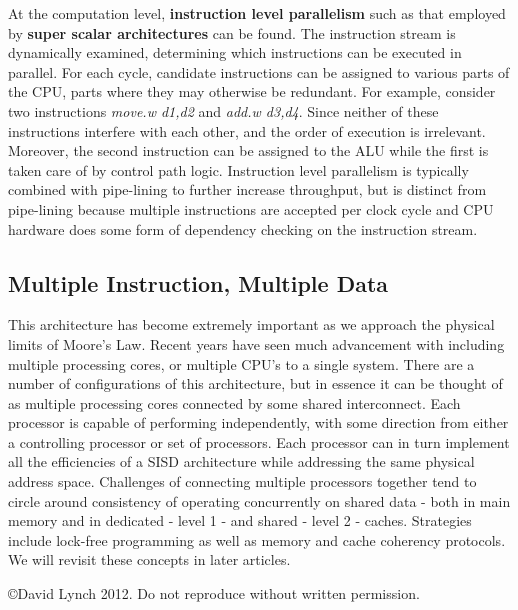 \documentclass[10pt,a4paper]{article}
\begin{document}
At the computation level, {\bf instruction level parallelism} such as that employed by {\bf super scalar architectures} can be found. The instruction stream is dynamically examined, determining which instructions can be executed in parallel. For each cycle, candidate instructions can be assigned to various parts of the CPU, parts where they may otherwise be redundant. For example, consider two instructions {\it move.w d1,d2} and {\it add.w d3,d4}. Since neither of these instructions interfere with each other, and the order of execution is irrelevant. Moreover, the second instruction can be assigned to the ALU while the first is taken care of by control path logic. Instruction level parallelism is typically combined with pipe-lining to further increase throughput, but is distinct from pipe-lining because multiple instructions are accepted per clock cycle and CPU hardware does some form of dependency checking on the instruction stream. 
\subsection{Multiple Instruction, Multiple Data}
This architecture has become extremely important as we approach the physical limits of Moore's Law. Recent years have seen much advancement with including multiple processing cores, or multiple CPU's to a single system. There are a number of configurations of this architecture, but in essence it can be thought of as multiple processing cores connected by some shared interconnect. Each processor is capable of performing independently, with some direction from either a controlling processor or set of processors. Each processor can in turn implement all the efficiencies of a SISD architecture while addressing the same physical address space. Challenges of connecting multiple processors together tend to circle around  consistency of operating concurrently on shared data - both in main memory and in dedicated - level 1 - and shared - level 2 - caches. Strategies include lock-free programming as well as memory and cache coherency protocols. We will revisit these concepts in later articles.  
{}

\begin{center}
{\small \copyright  David Lynch 2012. Do not reproduce without written permission.}
\end{center}
\end{document}

